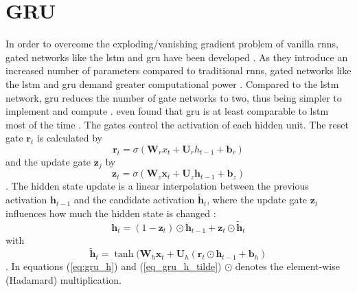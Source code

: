 \documentclass[12pt, a4paper, headinclude, twoside, plainheadsepline, open=right, numbers=noenddot, hidelinks, toc=listof, toc=bibliography]{scrreprt}
\begin{document}
\section{GRU}
\label{sec:gru}
In order to overcome the exploding/vanishing gradient problem of vanilla \acp{rnn}, gated networks like the \ac{lstm} \cite{hochreiterLongShortTermMemory1997} and \ac{gru} \cite{choLearningPhraseRepresentations2014} have been developed \cite{vanhoudtReviewLongShortterm2020}.
As they introduce an increased number of parameters compared to traditional \acp{rnn}, gated networks like the \ac{lstm} and \ac{gru} demand greater computational power \cite{deyGatevariantsGatedRecurrent2017}.
Compared to the \ac{lstm} network, \ac{gru} reduces the number of gate networks to two, thus being simpler to implement and compute \cite{choLearningPhraseRepresentations2014}.
 even found that \ac{gru} is at least comparable to \ac{lstm} most of the time \cite{chungEmpiricalEvaluationGated2014}.
The gates control the activation of each hidden unit.
The reset gate $\mathbf{r}_t$ is calculated by
\begin{equation}
\label{eq:gru_reset}
\mathbf{r}_t = \sigma (\mathbf{W}_r x_t + \mathbf{U}_r h_{t-1} + \mathbf{b}_r)
\end{equation}
and the update gate $\mathbf{z}_j$ by
\begin{equation}
\label{eq:gru_update}
\mathbf{z}_t = \sigma (\mathbf{W}_z \mathbf{x}_t + \mathbf{U}_z \mathbf{h}_{t-1} + \mathbf{b}_z)
\end{equation}
\cite{deyGatevariantsGatedRecurrent2017}.
The hidden state update is a linear interpolation between the previous activation $\mathbf{h}_{t-1}$ and the candidate activation $\mathbf{\tilde{h}}_t$, where the update gate $\mathbf{z}_t$ influences how much the hidden state is changed \cite{chungEmpiricalEvaluationGated2014}:
\begin{equation}
\label{eq:gru_h}
\mathbf{h}_t = (1-\mathbf{z}_t) \odot \mathbf{h}_{t-1} + \mathbf{z}_t \odot \mathbf{\tilde{h}}_t
\end{equation}
with
\begin{equation}
\label{eq_gru_h_tilde}
\mathbf{\tilde{h}}_t = \tanh(\mathbf{W}_h \mathbf{x}_t + \mathbf{U}_h (\mathbf{r}_t \odot \mathbf{h}_{t-1} + \mathbf{b}_h)
\end{equation}
.
In equations (\ref{eq:gru_h}) and (\ref{eq_gru_h_tilde}) $\odot$ denotes the element-wise (Hadamard) multiplication.
\end{document}
